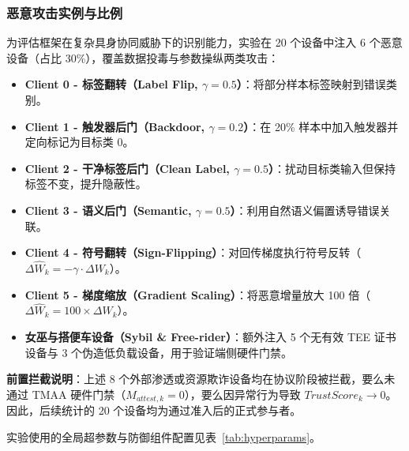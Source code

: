 \documentclass[11pt, a4paper, UTF8, fontset=fandol]{ctexart}
\begin{document}
\subsubsection{恶意攻击实例与比例}
为评估框架在复杂具身协同威胁下的识别能力，实验在 20 个设备中注入 6 个恶意设备（占比 30\%），覆盖数据投毒与参数操纵两类攻击：
\begin{itemize}
    \item \textbf{Client 0 - 标签翻转（Label Flip, $\gamma=0.5$）}：将部分样本标签映射到错误类别。
    \item \textbf{Client 1 - 触发器后门（Backdoor, $\gamma=0.2$）}：在 20\% 样本中加入触发器并定向标记为目标类 $0$。
    \item \textbf{Client 2 - 干净标签后门（Clean Label, $\gamma=0.5$）}：扰动目标类输入但保持标签不变，提升隐蔽性。
    \item \textbf{Client 3 - 语义后门（Semantic, $\gamma=0.5$）}：利用自然语义偏置诱导错误关联。
    \item \textbf{Client 4 - 符号翻转（Sign-Flipping）}：对回传梯度执行符号反转（$\Delta \widehat{W}_k = - \gamma \cdot \Delta W_k$）。
    \item \textbf{Client 5 - 梯度缩放（Gradient Scaling）}：将恶意增量放大 100 倍（$\Delta \widehat{W}_k = 100 \times \Delta W_k$）。
    \item \textbf{女巫与搭便车设备（Sybil \& Free-rider）}：额外注入 5 个无有效 TEE 证书设备与 3 个伪造低负载设备，用于验证端侧硬件门禁。
\end{itemize}

\textbf{前置拦截说明}：上述 8 个外部渗透或资源欺诈设备均在协议阶段被拦截，要么未通过 TMAA 硬件门禁（$M_{attest,k}=0$），要么因异常行为导致 $TrustScore_k \to 0$。因此，后续统计的 20 个设备均为通过准入后的正式参与者。

实验使用的全局超参数与防御组件配置见表~\ref{tab:hyperparams}。
\end{document}
